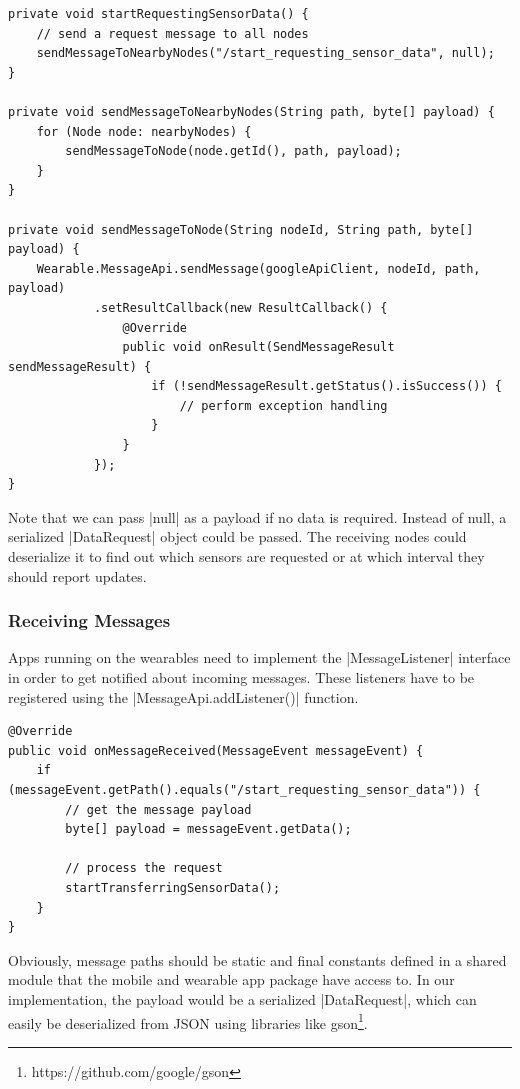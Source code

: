 \begin{lstlisting}[label=sendmessage]
private void startRequestingSensorData() {
	// send a request message to all nodes
	sendMessageToNearbyNodes("/start_requesting_sensor_data", null);
}

private void sendMessageToNearbyNodes(String path, byte[] payload) {
	for (Node node: nearbyNodes) {
		sendMessageToNode(node.getId(), path, payload);
	}
}

private void sendMessageToNode(String nodeId, String path, byte[] payload) {
	Wearable.MessageApi.sendMessage(googleApiClient, nodeId, path, payload)
			.setResultCallback(new ResultCallback() {
				@Override
				public void onResult(SendMessageResult sendMessageResult) {
					if (!sendMessageResult.getStatus().isSuccess()) {
						// perform exception handling
					}
				}
			});
}
\end{lstlisting}

Note that we can pass |null| as a payload if no data is required.
Instead of null, a serialized |DataRequest|\cite{sensordatalogger:datarequest} object could be passed.
The receiving nodes could deserialize it to find out which sensors are requested or at which interval they should report updates.

\subsubsection{Receiving Messages}

Apps running on the wearables need to implement the |MessageListener|\cite{androiddocs:messagelistener} interface in order to get notified about incoming messages. These listeners have to be registered using the |MessageApi.addListener()| function.

\begin{lstlisting}[label=receivemessage]
@Override
public void onMessageReceived(MessageEvent messageEvent) {
    if (messageEvent.getPath().equals("/start_requesting_sensor_data")) {
        // get the message payload
        byte[] payload = messageEvent.getData();

        // process the request
        startTransferringSensorData();
    }
}
\end{lstlisting}

Obviously, message paths should be static and final constants defined in a shared module that the mobile and wearable app package have access to. In our implementation, the payload would be a serialized |DataRequest|, which can easily be deserialized from JSON using libraries like gson\footnote{https://github.com/google/gson}.


